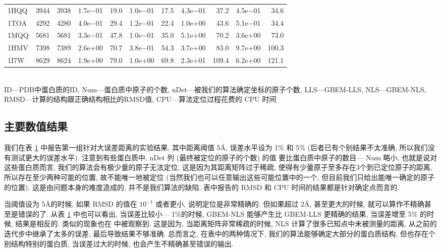 \begin{table}[!htbp]
{\begin{tabular}{lrrrrrrrrrr}
      1HQQ & 3944 & 3938 & 1.7e$-$01 & 19.0 & 1.0e$-$01 & 17.5 & 4.3e$-$01 &  37.2 & 4.5e$-$01&  34.6  \\
      1TOA & 4292 & 4280 & 4.0e$-$01 & 29.4 & 1.2e$-$01 & 22.4 & 1.0e$+$00 &  43.6 & 5.1e$-$01&  34.4  \\
      1MQQ & 5681 & 5681 & 3.3e$-$01 & 47.8 & 1.0e$-$01 & 35.0 & 5.1e$+$00 &  70.2 & 3.6e$+$00&  73.0  \\
      1HMV & 7398 & 7389 & 2.6e$+$00 & 70.7 & 3.8e$-$01 & 54.3 & 3.7e$+$00 &  83.0 & 9.7e$+$00& 100.3  \\
      1I7W & 8629 & 8624 & 1.9e$+$00 & 79.0 & 1.0e$+$00 & 69.8 & 2.3e$+$01 & 109.4 & 6.2e$+$00& 121.1  \\ \toprule
    \end{tabular}\\[-4mm]
    \label{table:cut5}
    \bl *ID---PDB中蛋白质的ID, Num---蛋白质中原子的个数, nDet---被我们的算法确定坐标的原子个数, LLS---GBEM-LLS, NLS---GBEM-NLS, RMSD---计算的结构跟正确结构相比的RMSD值, CPU---算法定位过程花费的 CPU 时间 \el
  }
\end{table}

\subsection{主要数值结果}
我们在表 \ref{table:cut5} 中报告第一组针对大误差距离的实验结果,
其中距离阈值 5\AA, 误差水平设为 1\% 和 5\% 
(后者已有个别结果不太准确, 所以我们没有测试更大的误差水平). 
注意到有些蛋白质中,  nDet 列 (最终被定位的原子的个数) 的值 
要比蛋白质中原子的数目--- Num 略小,
也就是说对这些蛋白质而言, 我们的算法会有极少量的原子无法定位,
这是因为其距离矩阵过于稀疏, 使得有少量原子至多存在3个到已定位原子的距离,
所以存在至少两种可能的位置, 故不能唯一地被定位 
(当然我们也可以任意输出这些可能位置中的一个, 但目前我们只给出能唯一确定的原子的位置). 这是由问题本身的难度造成的, 并不是我们算法的缺陷.
表中报告的 RMSD 和 CPU 时间的结果都是针对确定点而言的.

当阈值设为 5\AA 的时候, 如果 RMSD 的值在 $10^{-1}$ 或者更小,
说明定位是非常精确的.
但如果超过 2\AA, 甚至更大的时候, 就可以算作不精确甚至是错误的了.
从表 \ref{table:cut5} 中也可以看出, 当误差比较小--- 1\%的时候,
GBEM-NLS 能够产生比 GBEM-LLS 更精确的结果, 
当误差增至 5\% 的时候, 结果是相反的.
类似的现象也在 \cite{Sit2009} 中被观察到.
这是因为, 当距离矩阵非常稀疏的时候, 
NLS 计算了很多已知点中未被测量的距离, 从之前的迭代步中继承了太多的误差,
最后导致结果不够准确.
总而言之, 在表中的两种情况下, 我们的算法能够确定大部分的蛋白质结构,
但也存在个别结构特别的蛋白质, 当误差过大的时候,
也会产生不精确甚至错误的输出.

